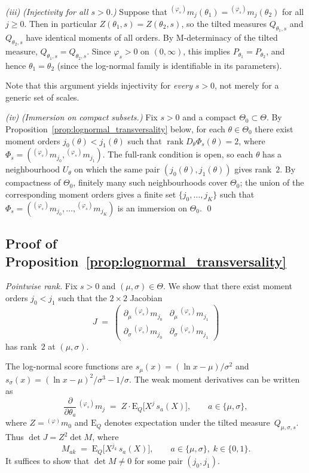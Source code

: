 \documentclass[11pt,a4paper]{article}
\newcommand{\E}{\mathrm{E}}
\newcommand{\wm}[1]{{}^{(\varphi)}\!m_{#1}}
\begin{document}
\emph{(iii)} \emph{(Injectivity for all $s > 0$.)}
Suppose that ${}^{(\varphi_s)}\!m_j(\theta_1) =
{}^{(\varphi_s)}\!m_j(\theta_2)$ for all $j \geq 0$.  Then in
particular $Z(\theta_1,s) = Z(\theta_2,s)$, so the tilted measures
$Q_{\theta_1,s}$ and $Q_{\theta_2,s}$ have identical moments of all
orders.  By M-determinacy of the tilted measure,
$Q_{\theta_1,s} = Q_{\theta_2,s}$.  Since $\varphi_s > 0$ on
$(0,\infty)$, this implies $P_{\theta_1} = P_{\theta_2}$, and hence
$\theta_1 = \theta_2$ (since the log-normal family is identifiable
in its parameters).

Note that this argument yields injectivity for \emph{every} $s > 0$,
not merely for a generic set of scales.

\emph{(iv)} \emph{(Immersion on compact subsets.)}
Fix $s > 0$ and a compact $\Theta_0 \subset \Theta$.  By
Proposition~\ref{prop:lognormal_transversality} below, for each
$\theta \in \Theta_0$ there exist moment orders $j_0(\theta) <
j_1(\theta)$ such that
$\operatorname{rank} D_\theta \Phi_s(\theta) = 2$, where
$\Phi_s = ({}^{(\varphi_s)}\!m_{j_0}, {}^{(\varphi_s)}\!m_{j_1})$.
The full-rank condition is open, so each $\theta$ has a neighbourhood
$U_\theta$ on which the same pair $(j_0(\theta), j_1(\theta))$
gives rank~$2$.  By compactness of $\Theta_0$, finitely many such
neighbourhoods cover $\Theta_0$; the union of the corresponding
moment orders gives a finite set $\{j_0, \ldots, j_K\}$ such that
$\Phi_s = ({}^{(\varphi_s)}\!m_{j_0}, \ldots,
{}^{(\varphi_s)}\!m_{j_K})$ is an immersion on $\Theta_0$.
\qed

\subsection*{Proof of
  Proposition~\ref{prop:lognormal_transversality}}

\emph{Pointwise rank.}
Fix $s > 0$ and $(\mu,\sigma) \in \Theta$.  We show that there exist
moment orders $j_0 < j_1$ such that the $2\times 2$ Jacobian
\[
  J \;=\;
  \begin{pmatrix}
    \partial_\mu\, {}^{(\varphi_s)}\!m_{j_0}
    & \partial_\mu\, {}^{(\varphi_s)}\!m_{j_1} \\[4pt]
    \partial_\sigma\, {}^{(\varphi_s)}\!m_{j_0}
    & \partial_\sigma\, {}^{(\varphi_s)}\!m_{j_1}
  \end{pmatrix}
\]
has rank~$2$ at $(\mu,\sigma)$.

The log-normal score functions are
$s_\mu(x) = (\ln x - \mu)/\sigma^2$ and
$s_\sigma(x) = (\ln x - \mu)^2/\sigma^3 - 1/\sigma$.
The weak moment derivatives can be written as
\[
  \frac{\partial}{\partial\theta_a}\,
  {}^{(\varphi_s)}\!m_j
  \;=\;
  Z \cdot \E_Q\!\bigl[X^j\, s_a(X)\bigr],
  \qquad a \in \{\mu,\sigma\},
\]
where $Z = \wm{0}$ and $\E_Q$ denotes expectation under the tilted
measure~$Q_{\mu,\sigma,s}$.  Thus
$\det J = Z^2 \det M$, where
\[
  M_{ak} \;=\; \E_Q\!\bigl[X^{j_k}\, s_a(X)\bigr],
  \qquad a \in \{\mu,\sigma\},\; k\in\{0,1\}.
\]
It suffices to show that $\det M \neq 0$ for some pair $(j_0,j_1)$.
\end{document}
